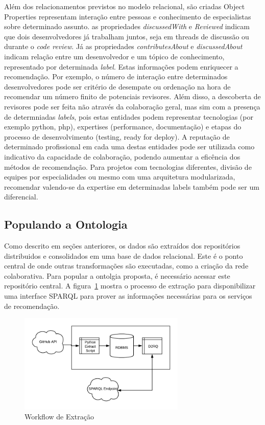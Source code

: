 \documentclass[a4paper,12pt]{monografia}
\theoremstyle{plain}
\theoremstyle{definition}
\theoremstyle{remark}
\begin{document}
Além dos relacionamentos previstos no modelo relacional, são criadas Object Properties representam interação entre pessoas e conhecimento de especialistas sobre determinado assunto. as propriedades \textit{discussedWith} e \textit{Reviewed} indicam que dois desenvolvedores já trabalham juntos, seja em threads de discussão ou durante o \textit{code review}. Já as propriedades \textit{contributesAbout} e \textit{discussedAbout} indicam relação entre um desenvolvedor e um tópico de conhecimento, representado por determinada \textit{label}. Estas informações podem enriquecer a recomendação. Por exemplo, o número de interação entre determinados desenvolvedores pode ser critério de desempate ou ordenação na hora de recomendar um número finito de potenciais revisores. Além disso, a descoberta de revisores pode ser feita não através da colaboração geral, mas sim com a presença de determniadas \textit{labels}, pois estas entidades podem representar tecnologias (por exemplo python, php), expertises (performance, documentação) e etapas do processo de desenvolvimento (testing, ready for deploy). A reputação de determinado profissional em cada uma destas entidades pode ser utilizada como indicativo da capacidade de colaboração, podendo aumentar a eficência dos métodos de recomendação. Para projetos com tecnologias diferentes, divisão de equipes por especialidades ou mesmo com uma arquitetura modularizada, recomendar valendo-se da expertise em determinadas labels também pode ser um diferencial.

\subsection{Populando a Ontologia}

Como descrito em seções anteriores, os dados são extraídos dos repositórios distribuidos e consolidados em uma base de dados relacional. Este é o ponto central de onde outras transformações são executadas, como a criação da rede colaborativa. Para popular a ontolgia proposta, é necessário acessar este repositório central. A figura~\ref{fig:workflow_ontologia} mostra o processo de extração para disponibilizar uma interface SPARQL para prover as informações necessárias para os serviços de recomendação.

\begin{figure}[!htbp]
 \centering
 \includegraphics[width=300]{workflow_ontologia}
 \caption{Workflow de Extração}\label{fig:workflow_ontologia}
\end{figure}
\end{document}
